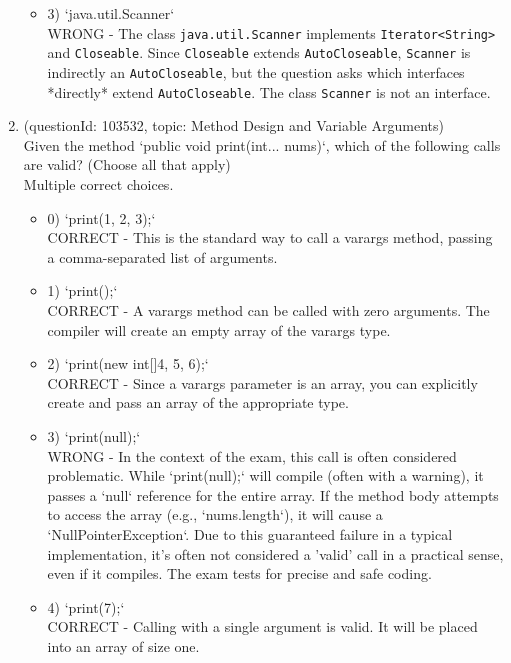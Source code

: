 \documentclass[12pt]{article}
\begin{document}
\begin{enumerate}[label=(\arabic*)]
\begin{itemize}
\item 3) `java.util.Scanner`
 \\ 
WRONG - The class \verb|java.util.Scanner| implements \verb|Iterator<String>| and \verb|Closeable|. Since \verb|Closeable| extends \verb|AutoCloseable|, \verb|Scanner| is indirectly an \verb|AutoCloseable|, but the question asks which interfaces *directly* extend \verb|AutoCloseable|. The class \verb|Scanner| is not an interface.

\end{itemize}
\item (questionId: 103532, topic: Method Design and Variable Arguments) \\ 
Given the method `public void print(int... nums)`, which of the following calls are valid? (Choose all that apply)
\\ \noindent Multiple correct choices. 
\begin{itemize}
\item 0) `print(1, 2, 3);`
 \\ 
CORRECT - This is the standard way to call a varargs method, passing a comma-separated list of arguments.

\item 1) `print();`
 \\ 
CORRECT - A varargs method can be called with zero arguments. The compiler will create an empty array of the varargs type.

\item 2) `print(new int[]{4, 5, 6});`
 \\ 
CORRECT - Since a varargs parameter is an array, you can explicitly create and pass an array of the appropriate type.

\item 3) `print(null);`
 \\ 
WRONG - In the context of the exam, this call is often considered problematic. While `print(null);` will compile (often with a warning), it passes a `null` reference for the entire array. If the method body attempts to access the array (e.g., `nums.length`), it will cause a `NullPointerException`. Due to this guaranteed failure in a typical implementation, it's often not considered a 'valid' call in a practical sense, even if it compiles. The exam tests for precise and safe coding.

\item 4) `print(7);`
 \\ 
CORRECT - Calling with a single argument is valid. It will be placed into an array of size one.


\end{itemize}
\end{enumerate}
\end{document}
